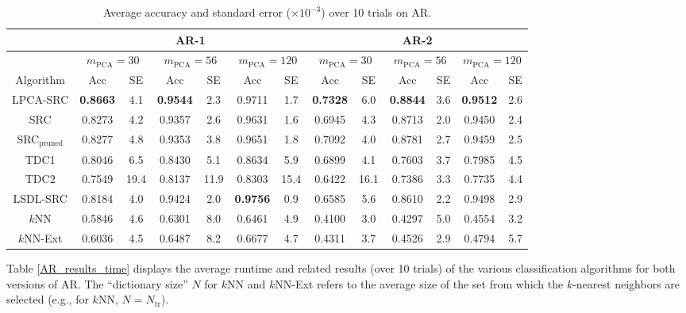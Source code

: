 \documentclass[review]{elsarticle}
\begin{document}
\begin{table}[!htb]
\small{
\centering
\begin{tabular}{|c|c|c|c|c|c|c|c|c|c|c|c|c|}
\hline
& \multicolumn{6}{|c|}{AR-1} & \multicolumn{6}{|c|}{AR-2} \\
\hline
& \multicolumn{2}{|c|}{$m_{\mathrm{PCA}} = 30$} & \multicolumn{2}{|c|}{$m_{\mathrm{PCA}} = 56$}  & \multicolumn{2}{|c|}{$m_{\mathrm{PCA}} = 120$}  & \multicolumn{2}{|c|}{$m_{\mathrm{PCA}} = 30$}  & \multicolumn{2}{|c|}{$m_{\mathrm{PCA}} = 56$} & \multicolumn{2}{|c|}{$m_{\mathrm{PCA}} = 120$}  \\
\hline
Algorithm & Acc & SE  & Acc & SE  &  Acc & SE  &  Acc & SE  &  Acc & SE &   Acc & SE   \\
\hline
LPCA-SRC	& \textbf{0.8663}	& 4.1	 & \textbf{0.9544}	& 2.3 & 0.9711	& 1.7 & \textbf{0.7328}	& 6.0 & \textbf{0.8844}	& 3.6 & \textbf{0.9512}	&  2.6 \\
SRC		& 0.8273	& 4.2		& 0.9357 &	2.6	& 0.9631		& 1.6 & 0.6945	&  4.3 & 0.8713	& 2.0 & 0.9450	& 2.4 \\
SRC$_\text{pruned}$ 	& 0.8277	& 4.8	&	0.9353	& 3.8 & 0.9651	& 1.8 & 0.7092	& 4.0 & 0.8781	& 2.7 & 0.9459	& 2.5\\
TDC1	&	0.8046	&	6.5		&	0.8430	&	5.1 &	0.8634	&	5.9	&	0.6899	&	4.1	&	0.7603	&	3.7 &	0.7985	&	4.5\\
TDC2		&	0.7549	&	19.4		&	0.8137	&	11.9	&	0.8303	&	15.4 & 0.6422	& 16.1 &	0.7386	&	3.3 &	0.7735	&	4.4 \\
LSDL-SRC		& 0.8184	& 4.0		&  0.9424	& 2.0 & \textbf{0.9756}	& 0.9 & 0.6585	& 5.6 & 0.8610	& 2.2 & 0.9498	& 2.9 \\
$k$NN 	& 0.5846	& 4.6	&  0.6301	& 8.0 & 0.6461	& 4.9 & 0.4100	& 3.0 & 0.4297	& 5.0 & 0.4554	& 3.2\\
$k$NN-Ext & 0.6036	& 4.5	&  0.6487	& 8.2 & 0.6677	& 4.7 & 0.4311	& 3.7 & 0.4526	& 2.9 & 0.4794	& 5.7  \\
\hline
\end{tabular}
\caption{Average accuracy and standard error ($\times 10^{-3}$) over 10 trials on AR.} 
\label{AR_results_acc}}
\end{table}



Table \ref{AR_results_time} displays the average runtime and related results (over 10 trials) of the various classification algorithms for both versions of AR. The ``dictionary size'' $N$ for $k$NN and $k$NN-Ext refers to the average size of the set from which the $k$-nearest neighbors are selected (e.g., for $k$NN, $N = N_\text{tr}$). 
\end{document}
